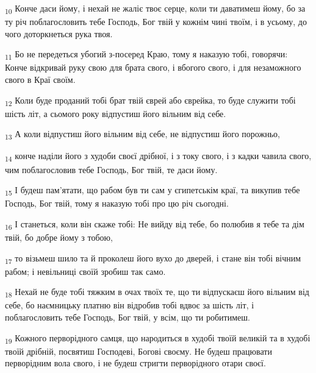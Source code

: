 \begin{tcolorbox}
\textsubscript{10} Конче даси йому, і нехай не жаліє твоє серце, коли ти даватимеш йому, бо за ту річ поблагословить тебе Господь, Бог твій у кожнім чині твоїм, і в усьому, до чого доторкнеться рука твоя.
\end{tcolorbox}
\begin{tcolorbox}
\textsubscript{11} Бо не передеться убогий з-посеред Краю, тому я наказую тобі, говорячи: Конче відкривай руку свою для брата свого, і вбогого свого, і для незаможного свого в Краї своїм.
\end{tcolorbox}
\begin{tcolorbox}
\textsubscript{12} Коли буде проданий тобі брат твій єврей або єврейка, то буде служити тобі шість літ, а сьомого року відпустиш його вільним від себе.
\end{tcolorbox}
\begin{tcolorbox}
\textsubscript{13} А коли відпустиш його вільним від себе, не відпустиш його порожньо,
\end{tcolorbox}
\begin{tcolorbox}
\textsubscript{14} конче наділи його з худоби своєї дрібної, і з току свого, і з кадки чавила свого, чим поблагословив тебе Господь, Бог твій, те даси йому.
\end{tcolorbox}
\begin{tcolorbox}
\textsubscript{15} І будеш пам'ятати, що рабом був ти сам у єгипетськім краї, та викупив тебе Господь, Бог твій, тому я наказую тобі про цю річ сьогодні.
\end{tcolorbox}
\begin{tcolorbox}
\textsubscript{16} І станеться, коли він скаже тобі: Не вийду від тебе, бо полюбив я тебе та дім твій, бо добре йому з тобою,
\end{tcolorbox}
\begin{tcolorbox}
\textsubscript{17} то візьмеш шило та й проколеш його вухо до дверей, і стане він тобі вічним рабом; і невільниці своїй зробиш так само.
\end{tcolorbox}
\begin{tcolorbox}
\textsubscript{18} Нехай не буде тобі тяжким в очах твоїх те, що ти відпускаєш його вільним від себе, бо наємницьку платню він відробив тобі вдвоє за шість літ, і поблагословить тебе Господь, Бог твій, у всім, що ти робитимеш.
\end{tcolorbox}
\begin{tcolorbox}
\textsubscript{19} Кожного перворідного самця, що народиться в худобі твоїй великій та в худобі твоїй дрібній, посвятиш Господеві, Богові своєму. Не будеш працювати перворідним вола свого, і не будеш стригти перворідного отари своєї.
\end{tcolorbox}
